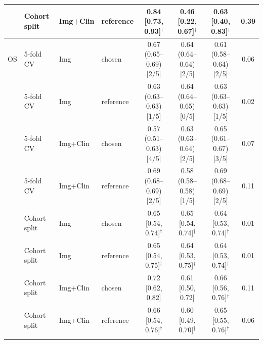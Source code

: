\begin{tabular}{@{}llllcccc@{}}
 & Cohort split & Img+Clin & reference & 0.84 [0.73, 0.93]$^{\dagger}$ & 0.46 [0.22, 0.67]$^{\dagger}$ & 0.63 [0.40, 0.83]$^{\dagger}$ & 0.39 \\
\midrule
OS & 5-fold CV & Img & chosen & 0.67 (0.65--0.69) [2/5] & 0.64 (0.64--0.64) [2/5] & 0.61 (0.58--0.64) [2/5] & 0.06 \\
 & 5-fold CV & Img & reference & 0.63 (0.63--0.63) [1/5] & 0.64 (0.64--0.65) [0/5] & 0.63 (0.63--0.63) [1/5] & 0.02 \\
 & 5-fold CV & Img+Clin & chosen & 0.57 (0.51--0.63) [4/5] & 0.63 (0.63--0.64) [2/5] & 0.65 (0.61--0.67) [3/5] & 0.07 \\
 & 5-fold CV & Img+Clin & reference & 0.69 (0.68--0.69) [2/5] & 0.58 (0.58--0.58) [1/5] & 0.69 (0.68--0.69) [2/5] & 0.11 \\
 & Cohort split & Img & chosen & 0.65 [0.54, 0.74]$^{\dagger}$ & 0.65 [0.54, 0.74]$^{\dagger}$ & 0.64 [0.53, 0.74]$^{\dagger}$ & 0.01 \\
 & Cohort split & Img & reference & 0.65 [0.54, 0.75]$^{\dagger}$ & 0.64 [0.53, 0.75]$^{\dagger}$ & 0.64 [0.53, 0.74]$^{\dagger}$ & 0.01 \\
 & Cohort split & Img+Clin & chosen & 0.72 [0.62, 0.82] & 0.61 [0.50, 0.72] & 0.66 [0.56, 0.76]$^{\dagger}$ & 0.11 \\
 & Cohort split & Img+Clin & reference & 0.66 [0.54, 0.76]$^{\dagger}$ & 0.60 [0.49, 0.70]$^{\dagger}$ & 0.65 [0.55, 0.76]$^{\dagger}$ & 0.06 \\
\botrule
\end{tabular}
